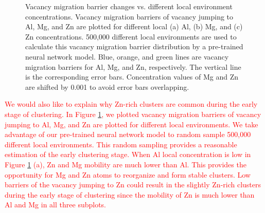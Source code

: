 \begingroup
\begin{figure}[!ht]
  \centering
\caption[Vacancy migration barrier changes vs. different local environment concentrations.]{Vacancy migration barrier changes vs. different local environment concentrations. Vacancy migration barriers of vacancy jumping to Al, Mg, and Zn are plotted for different local (a) Al, (b) Mg, and (c) Zn concentrations. 500,000 different local environments are used to calculate this vacancy migration barrier distribution by a pre-trained neural network model. Blue, orange, and green lines are vacancy migration barriers for Al, Mg, and Zn, respectively. The vertical line is the corresponding error bars. Concentration values of Mg and Zn are shifted by 0.001 to avoid error bars overlapping.}
\label{Chap:Al/Vac:fig:conc_E}
\end{figure}
\endgroup


\textcolor{red}{We would also like to explain why Zn-rich clusters are common during the early stage of clustering. In Figure \ref{Chap:Al/Vac:fig:conc_E}, we plotted vacancy migration barriers of vacancy jumping to Al, Mg, and Zn are plotted for different local environments. We take advantage of our pre-trained neural network model to random sample 500,000 different local environments. This random sampling provides a reasonable estimation of the early clustering stage. When Al local concentration is low in Figure \ref{Chap:Al/Vac:fig:conc_E} (a), Zn and Mg mobility are much lower than Al. This provides the opportunity for Mg and Zn atoms to reorganize and form stable clusters. Low barriers of the vacancy jumping to Zn could result in the slightly Zn-rich clusters during the early stage of clustering since the mobility of Zn is much lower than Al and Mg in all three subplots.}


